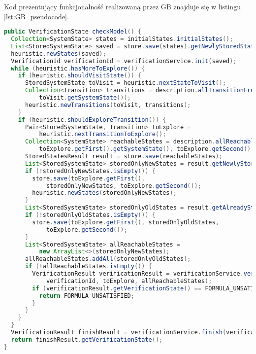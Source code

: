 Kod prezentujący funkcjonalność realizowaną przez GB znajduje się w listingu \ref{lst:GB_pseudocode}.

\begin{minipage}{\linewidth}
\begin{lstlisting}[caption={Kod algorytmu realizowanego przez GB w języku Java.},captionpos=b,label={lst:GB_pseudocode},language=Java]
public VerificationState checkModel() {
  Collection<SystemState> states = initialStates.initialStates();
  List<StoredSystemState> saved = store.save(states).getNewlyStoredStates();
  heuristic.newStates(saved);
  VerificationId verificationId = verificationService.init(saved);
  while (heuristic.hasMoreToExplore()) {
    if (heuristic.shouldVisitState()) {
      StoredSystemState toVisit = heuristic.nextStateToVisit();
      Collection<Transition> transitions = description.allTransitionFromState(
          toVisit.getSystemState());
      heuristic.newTransitions(toVisit, transitions);
    }
    if (heuristic.shouldExploreTransition()) {
      Pair<StoredSystemState, Transition> toExplore = 
          heuristic.nextTransitionToExplore();
      Collection<SystemState> reachableStates = description.allReachableStates(
          toExplore.getFirst().getSystemState(), toExplore.getSecond());
      StoredStatesResult result = store.save(reachableStates);
      List<StoredSystemState> storedOnlyNewStates = result.getNewlyStoredStates();
      if (!storedOnlyNewStates.isEmpty()) {
        store.save(toExplore.getFirst(),
            storedOnlyNewStates, toExplore.getSecond());
        heuristic.newStates(storedOnlyNewStates);
      }
      List<StoredSystemState> storedOnlyOldStates = result.getAlreadyStoredStates();
      if (!storedOnlyOldStates.isEmpty()) {
        store.save(toExplore.getFirst(), storedOnlyOldStates,
            toExplore.getSecond());
      }
      List<StoredSystemState> allReachableStates =
          new ArrayList<>(storedOnlyNewStates);
      allReachableStates.addAll(storedOnlyOldStates);
      if (!allReachableStates.isEmpty()) {
        VerificationResult verificationResult = verificationService.verifyNewStates(
            verificationId, toExplore, allReachableStates);
        if (verificationResult.getVerificationState() == FORMULA_UNSATISFIED) {
          return FORMULA_UNSATISFIED;
        }
      }
    }
  }
  VerificationResult finishResult = verificationService.finish(verificationId);
  return finishResult.getVerificationState();
}
\end{lstlisting}
\end{minipage}


